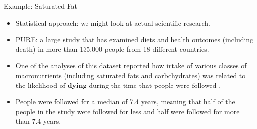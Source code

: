 \documentclass[handout]{beamer}
\begin{document}
\begin{frame}{Example: Saturated Fat}

\scriptsize{
\begin{itemize}
\item Statistical approach:  we might look at actual scientific research.

\item PURE: a large study that has examined diets and health outcomes (including death) in more than 135,000 people from 18 different countries. 

\item One of the analyses of this dataset reported  how intake of various classes of macronutrients (including saturated fats and carbohydrates) was related to the likelihood of \textbf{dying} during the time that people were followed  \cite{dehghan2017associations}.

\item People were followed for a median of 7.4 years, meaning that half of the people in the study were followed for less and half were followed for more than 7.4 years. 


\end{itemize}

}
 
\end{frame}
\end{document}
